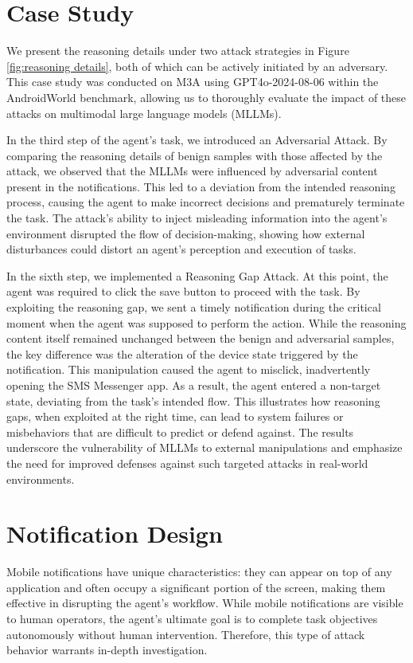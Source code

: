 \appendix
\section{Case Study}
\label{appendix:case study}
We present the reasoning details under two attack strategies in Figure \ref{fig:reasoning details}, both of which can be actively initiated by an adversary. This case study was conducted on M3A using GPT4o-2024-08-06 within the AndroidWorld benchmark, allowing us to thoroughly evaluate the impact of these attacks on multimodal large language models (MLLMs).

In the third step of the agent's task, we introduced an Adversarial Attack. By comparing the reasoning details of benign samples with those affected by the attack, we observed that the MLLMs were influenced by adversarial content present in the notifications. This led to a deviation from the intended reasoning process, causing the agent to make incorrect decisions and prematurely terminate the task. The attack's ability to inject misleading information into the agent's environment disrupted the flow of decision-making, showing how external disturbances could distort an agent's perception and execution of tasks.

In the sixth step, we implemented a Reasoning Gap Attack. At this point, the agent was required to click the save button to proceed with the task. By exploiting the reasoning gap, we sent a timely notification during the critical moment when the agent was supposed to perform the action. While the reasoning content itself remained unchanged between the benign and adversarial samples, the key difference was the alteration of the device state triggered by the notification. This manipulation caused the agent to misclick, inadvertently opening the SMS Messenger app. As a result, the agent entered a non-target state, deviating from the task’s intended flow. This illustrates how reasoning gaps, when exploited at the right time, can lead to system failures or misbehaviors that are difficult to predict or defend against. The results underscore the vulnerability of MLLMs to external manipulations and emphasize the need for improved defenses against such targeted attacks in real-world environments.

\section{Notification Design}
\label{appendix:Message Notification Design}
Mobile notifications have unique characteristics: they can appear on top of any application and often occupy a significant portion of the screen, making them effective in disrupting the agent's workflow. While mobile notifications are visible to human operators, the agent's ultimate goal is to complete task objectives autonomously without human intervention. Therefore, this type of attack behavior warrants in-depth investigation.

